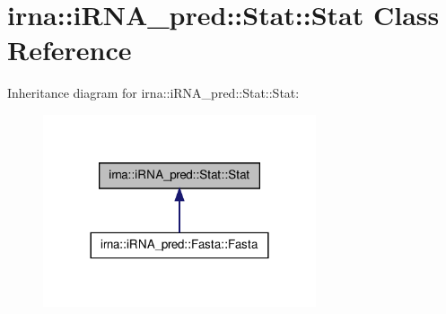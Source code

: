 \hypertarget{classirna_1_1iRNA__pred_1_1Stat_1_1Stat}{
\section{irna\-:\-:i\-R\-N\-A\-\_\-pred\-:\-:\-Stat\-:\-:\-Stat \-Class \-Reference}
\label{classirna_1_1iRNA__pred_1_1Stat_1_1Stat}
}


\-Inheritance diagram for irna\-:\-:i\-R\-N\-A\-\_\-pred\-:\-:\-Stat\-:\-:\-Stat\-:\nopagebreak
\begin{figure}[H]
\begin{center}
\leavevmode
\includegraphics[width=228pt]{classirna_1_1iRNA__pred_1_1Stat_1_1Stat__inherit__graph}
\end{center}
\end{figure}
